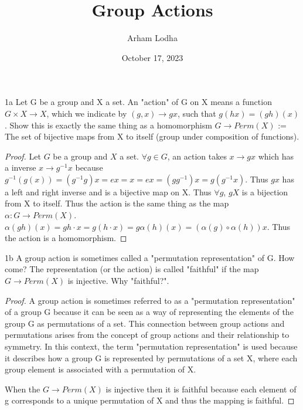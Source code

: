 \documentclass{article}
\begin{document}
\title{Group Actions}
\author{Arham Lodha}%
\date{October 17, 2023}%
\maketitle

\begin{PROB}{1a}\label{Problem 1a.}
    Let G be a group and X a set. An "action" of G on X means a function $G \times X \to X$, which we indicate by $(g,x) \to gx$, such that $g(hx) = (gh)(x)$. Show this is exactly the same thing as a homomorphism $ G \to Perm(X)$ := The set of bijective maps from X to itself (group under composition of functions).
\end{PROB}
\begin{proof}
    Let $G$ be a group and $X$ a set. $\forall g \in G$, an action takes $x \to gx$ which has a inverse $x \to g^{-1}x$ because $g^{-1}(g(x)) = (g^{-1}g)x = ex = x = ex = (gg^{-1})x = g(g^{-1}x)$. Thus $gx$ has a left and right inverse and is a bijective map on X. Thus $\forall g$, $gX$ is a bijection from X to itself. Thus the action is the same thing as the map $\alpha: G \to Perm(X)$. $\alpha(gh)(x) = gh \cdot x = g(h \cdot x) = g\alpha(h)(x) = (\alpha(g) \circ \alpha(h))x$. Thus the action is a homomorphism.
\end{proof}

\bigskip

\begin{PROB}{1b}\label{Problem 1b.}
    A group action is sometimes called a "permutation representation" of G. How come? The representation (or the action) is called "faithful" if the map $G \to Perm(X)$ is injective. Why "faithful?". 
\end{PROB}
\begin{proof}
    A group action is sometimes referred to as a "permutation representation" of a group G because it can be seen as a way of representing the elements of the group G as permutations of a set. This connection between group actions and permutations arises from the concept of group actions and their relationship to symmetry. In this context, the term "permutation representation" is used because it describes how a group G is represented by permutations of a set X, where each group element is associated with a permutation of X.

    When the $G \to Perm(X)$ is injective then it is faithful because each element of g corresponds to a unique permutation of X and thus the mapping is faithful.
\end{proof}
\end{document}

